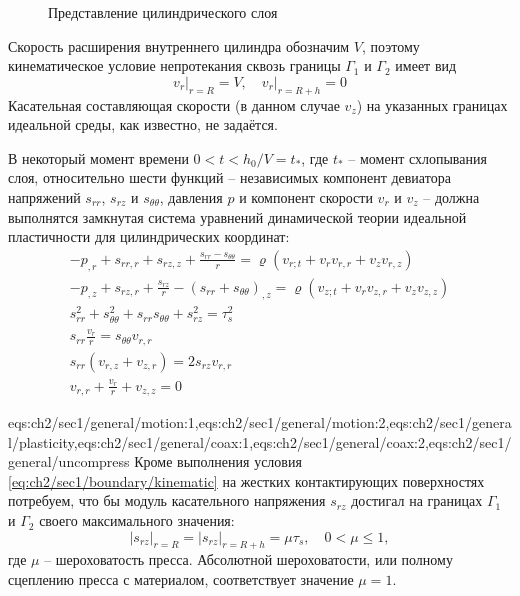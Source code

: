 \begin{figure}[ht]
  \caption{Представление цилиндрического слоя}
  \label{fig:ch2/layer}
\end{figure}
Скорость расширения внутреннего цилиндра обозначим $V$, поэтому кинематическое условие непротекания сквозь границы $\Gamma_{1}$ и $\Gamma_{2}$ имеет вид
\begin{equation}
  \label{eq:ch2/sec1/boundary/kinematic}
  v_{r}\lvert_{r=R} = V, \quad v_{r}\lvert_{r=R+h} = 0
\end{equation}
Касательная составляющая скорости (в данном случае $v_{z}$) на указанных границах идеальной среды, как известно, не задаётся.

В некоторый момент времени $0 < t < h_{0}/V = t_*$, где $t_*$ -- момент схлопывания слоя, относительно шести функций -- независимых компонент девиатора напряжений $s_{rr}$, $s_{rz}$ и $s_{\theta\theta}$, давления $p$ и компонент скорости $v_{r}$ и $v_{z}$ -- должна выполнятся замкнутая система уравнений динамической теории идеальной пластичности для цилиндрических координат:
\begin{gather}
  \label{eqs:ch2/sec1/general/motion:1}
  -p_{,r}+s_{rr,r}+s_{rz,z}+\frac{s_{rr}-s_{\theta\theta}}{r} = \varrho \left(v_{r;t}+v_{r} v_{r,r} + v_{z} v_{r,z} \right)
  \\
  \label{eqs:ch2/sec1/general/motion:2}
  -p_{,z}+s_{rz,r}+\frac{s_{rz}}{r}-(s_{rr}+s_{\theta\theta})_{,z} = \varrho \left(v_{z;t}+v_{r} v_{z,r} + v_{z} v_{z,z} \right)
  \\
  \label{eqs:ch2/sec1/general/plasticity}
  s^2_{rr}+s^2_{\theta\theta}+s_{rr} s_{\theta\theta} + s^2_{rz}=\tau^2_{s}
  \\
  \label{eqs:ch2/sec1/general/coax:1}
  s_{rr} \frac{v_{r}}{r} = s_{\theta\theta} v_{r,r}
  \\
  \label{eqs:ch2/sec1/general/coax:2}
  s_{rr} (v_{r,z}+v_{z,r}) = 2 s_{rz} v_{r,r}
  \\
  \label{eqs:ch2/sec1/general/uncompress}
  v_{r,r}+\frac{v_{r}}{r}+v_{z,z} = 0
\end{gather}

\expandafter\gdef\csname eqs:ch2/sec1/general\endcsname{eqs:ch2/sec1/general/motion:1,eqs:ch2/sec1/general/motion:2,eqs:ch2/sec1/general/plasticity,eqs:ch2/sec1/general/coax:1,eqs:ch2/sec1/general/coax:2,eqs:ch2/sec1/general/uncompress}
Кроме выполнения условия \cref{eq:ch2/sec1/boundary/kinematic} на жестких контактирующих поверхностях потребуем, что бы модуль касательного напряжения $s_{rz}$ достигал на границах $\Gamma_{1}$ и $\Gamma_{2}$ своего максимального значения:
\begin{equation}
  \label{eq:ch2/sec1/boundary/force}
  \lvert s_{rz}\lvert_{r=R} = \lvert s_{rz}\lvert_{r=R+h} = \mu \tau_{s}, \quad 0 < \mu \le 1,
\end{equation}
где $\mu$ -- шероховатость пресса. Абсолютной шероховатости, или полному сцеплению пресса с материалом, соответствует значение $\mu = 1$.

